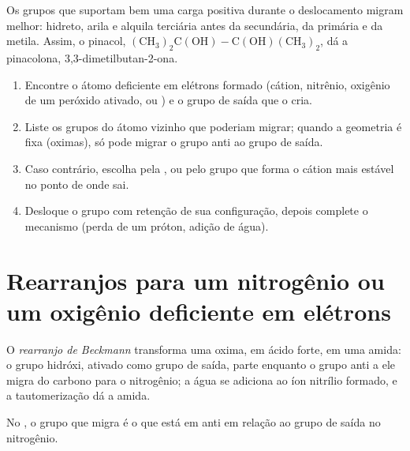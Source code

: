 Os grupos que suportam bem uma carga positiva durante o deslocamento migram melhor: hidreto,
arila e alquila terciária antes da secundária, da primária e da metila. Assim, o pinacol,
$\mathrm{(CH_3)_2C(OH){-}C(OH)(CH_3)_2}$, dá a pinacolona, 3,3-dimetilbutan-2-ona.

\begin{method}\label{met:b3:radicals-carbenes:rearrangement}
\begin{enumerate}
  \item Encontre o átomo deficiente em elétrons formado (cátion, nitrênio, oxigênio de um
        peróxido ativado,  ou ) e o grupo de saída que o cria.
  \item Liste os grupos do átomo vizinho que poderiam migrar; quando a
        geometria é fixa (oximas), só pode migrar o grupo anti ao grupo de saída.
  \item Caso contrário, escolha pela , ou pelo grupo que forma o cátion mais
        estável no ponto de onde sai.
  \item Desloque o grupo com retenção de sua configuração, depois complete o
        mecanismo (perda de um próton, adição de água).
\end{enumerate}
\end{method}

\section{Rearranjos para um nitrogênio ou um oxigênio deficiente em elétrons}

\begin{definition}\label{def:b3:radicals-carbenes:beckmann}
O \emph{rearranjo de Beckmann} transforma uma oxima,
em ácido forte, em uma amida: o grupo hidróxi, ativado como grupo de saída,
parte enquanto o grupo anti a ele migra do carbono para o nitrogênio; a água se adiciona
ao íon nitrílio formado, e a tautomerização dá a amida.
\end{definition}

\begin{proposition}\label{prop:b3:radicals-carbenes:beckmann-anti}
No , o grupo que migra é o que está em anti em relação ao
grupo de saída no nitrogênio.
\end{proposition}

